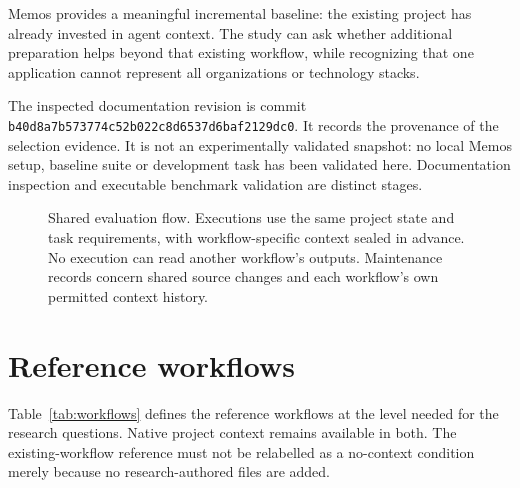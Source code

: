 \documentclass[11pt,letterpaper,twocolumn]{article}
\begin{document}
Memos provides a meaningful incremental baseline: the existing project has already invested in agent context. The study can ask whether additional preparation helps beyond that existing workflow, while recognizing that one application cannot represent all organizations or technology stacks.

The inspected documentation revision is commit
\nolinkurl{b40d8a7b573774c52b022c8d6537d6baf2129dc0}.
It records the provenance of the selection evidence. It is not an experimentally validated snapshot: no local Memos setup, baseline suite or development task has been validated here. Documentation inspection and executable benchmark validation are distinct stages.

\begin{figure}[t]
\centering
{}
\caption{Shared evaluation flow. Executions use the same project state and task requirements, with workflow-specific context sealed in advance. No execution can read another workflow's outputs. Maintenance records concern shared source changes and each workflow's own permitted context history.}
\label{fig:flow}
\end{figure}

\section{Reference workflows}
Table~\ref{tab:workflows} defines the reference workflows at the level needed for the research questions. Native project context remains available in both. The existing-workflow reference must not be relabelled as a no-context condition merely because no research-authored files are added.
\end{document}
